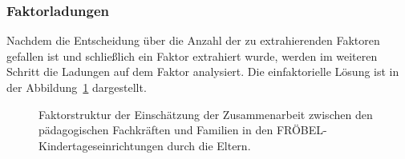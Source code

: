 \documentclass[12pt,a4paper]{article}
\begin{document}
\subsubsection{Faktorladungen}
Nachdem die Entscheidung über die Anzahl der zu extrahierenden Faktoren gefallen ist und schließlich ein Faktor extrahiert wurde, werden im weiteren Schritt die Ladungen auf dem Faktor analysiert. Die einfaktorielle Lösung ist in der Abbildung~\ref{fig_fak} dargestellt.

\begin{figure}[h]
\centering
\caption{Faktorstruktur der Einschätzung der Zusammenarbeit zwischen den pädagogischen Fachkräften und Familien in den FRÖBEL-Kinder\-tages\-ein\-rich\-tungen durch die Eltern.}
\label{fig_fak}
\end{figure}
\end{document}
